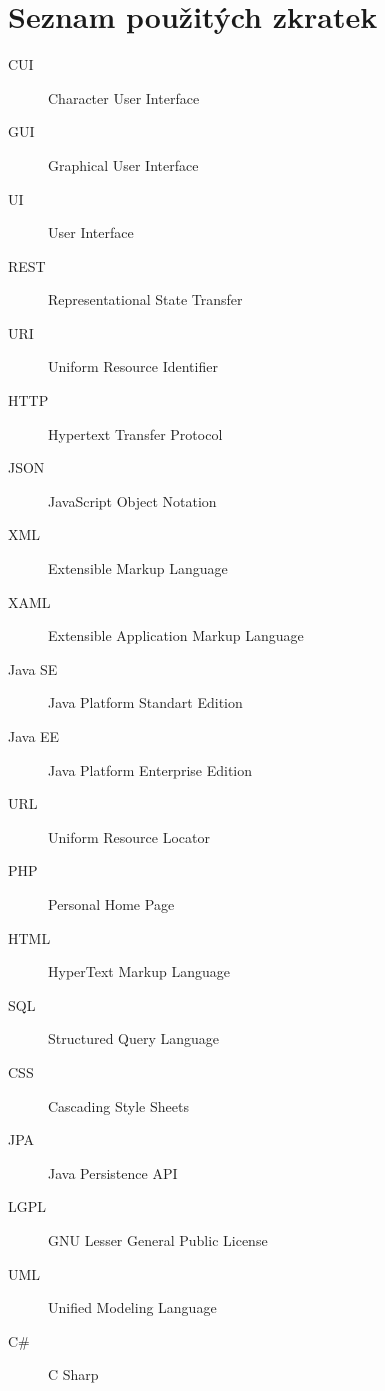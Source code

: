 \chapter{Seznam použitých zkratek}

\begin{description}
\item[CUI] Character User Interface
\item[GUI] Graphical User Interface
\item[UI] User Interface
\item[REST] Representational State Transfer
\item[URI] Uniform Resource Identifier
\item[HTTP] Hypertext Transfer Protocol
\item[JSON] JavaScript Object Notation
\item[XML] Extensible Markup Language
\item[XAML] Extensible Application Markup Language 
\item[Java SE] Java Platform Standart Edition
\item[Java EE] Java Platform Enterprise Edition
\item[URL] Uniform Resource Locator
\item[PHP] Personal Home Page
\item[HTML] HyperText Markup Language
\item[SQL] Structured Query Language
\item[CSS] Cascading Style Sheets
\item[JPA] Java Persistence API
\item[LGPL] GNU Lesser General Public License 
\item[UML] Unified Modeling Language
\item[C\#] C Sharp


\end{description}